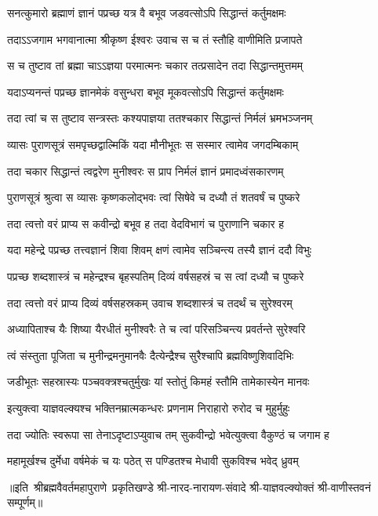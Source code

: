 \twolineshloka
{सनत्कुमारो ब्रह्माणं ज्ञानं पप्रच्छ यत्र वै}
{बभूव जडवत्सोऽपि सिद्धान्तं कर्तुमक्षमः}%

\twolineshloka
{तदाऽऽजगाम भगवानात्मा श्रीकृष्ण ईश्वरः}
{उवाच स च तं स्तौहि वाणीमिति प्रजापते}%

\twolineshloka
{स च तुष्टाव तां ब्रह्मा चाऽऽज्ञया परमात्मनः}
{चकार तत्प्रसादेन तदा सिद्धान्तमुत्तमम्}%

\twolineshloka
{यदाऽप्यनन्तं पप्रच्छ ज्ञानमेकं वसुन्धरा}
{बभूव मूकवत्सोऽपि सिद्धान्तं कर्तुमक्षमः}%

\twolineshloka
{तदा त्वां च स तुष्टाव सन्त्रस्तः कश्यपाज्ञया}
{ततश्चकार सिद्धान्तं निर्मलं भ्रमभञ्जनम्}%

\twolineshloka
{व्यासः पुराणसूत्रं समपृच्छद्वाल्मिकिं यदा}
{मौनीभूतः स सस्मार त्वामेव जगदम्बिकाम्}%

\twolineshloka
{तदा चकार सिद्धान्तं त्वद्वरेण मुनीश्वरः}
{स प्राप निर्मलं ज्ञानं प्रमादध्वंसकारणम्}%

\twolineshloka
{पुराणसूत्रं श्रुत्वा स व्यासः कृष्णकलोद्भवः}
{त्वां सिषेवे च दध्यौ तं शतवर्षं च पुष्करे}%

\twolineshloka
{तदा त्वत्तो वरं प्राप्य स कवीन्द्रो बभूव ह}
{तदा वेदविभागं च पुराणानि चकार ह}%

\twolineshloka
{यदा महेन्द्रे पप्रच्छ तत्त्वज्ञानं शिवा शिवम्}
{क्षणं त्वामेव सञ्चिन्त्य तस्यै ज्ञानं ददौ विभुः}%

\twolineshloka
{पप्रच्छ शब्दशास्त्रं च महेन्द्रश्च बृहस्पतिम्}
{दिव्यं वर्षसहस्रं च स त्वां दध्यौ च पुष्करे}%

\twolineshloka
{तदा त्वत्तो वरं प्राप्य दिव्यं वर्षसहस्रकम्}
{उवाच शब्दशास्त्रं च तदर्थं च सुरेश्वरम्}%

\twolineshloka
{अध्यापिताश्च यैः शिष्या यैरधीतं मुनीश्वरैः}
{ते च त्वां परिसञ्चिन्त्य प्रवर्तन्ते सुरेश्वरि}%

\twolineshloka
{त्वं संस्तुता पूजिता च मुनीन्द्रमनुमानवैः}
{दैत्येन्द्रैश्च सुरैश्चापि ब्रह्मविष्णुशिवादिभिः}%

\twolineshloka
{जडीभूतः सहस्रास्यः पञ्चवक्त्रश्चतुर्मुखः}
{यां स्तोतुं किमहं स्तौमि तामेकास्येन मानवः}%

\twolineshloka
{इत्युक्त्वा याज्ञवल्क्यश्च भक्तिनम्रात्मकन्धरः}
{प्रणनाम निराहारो रुरोद च मुहुर्मुहुः}%

\twolineshloka
{तदा ज्योतिः स्वरूपा सा तेनाऽदृष्टाऽप्युवाच तम्}
{सुकवीन्द्रो भवेत्युक्त्वा वैकुण्ठं च जगाम ह}%

\twolineshloka
{महामूर्खश्च दुर्मेधा वर्षमेकं च यः पठेत्}
{स पण्डितश्च मेधावी सुकविश्च भवेद् ध्रुवम्}%

{॥इति~श्रीब्रह्मवैवर्तमहापुराणे~प्रकृतिखण्डे श्री-नारद-नारायण-संवादे श्री-याज्ञवल्क्योक्तं श्री-वाणीस्तवनं सम्पूर्णम्॥}